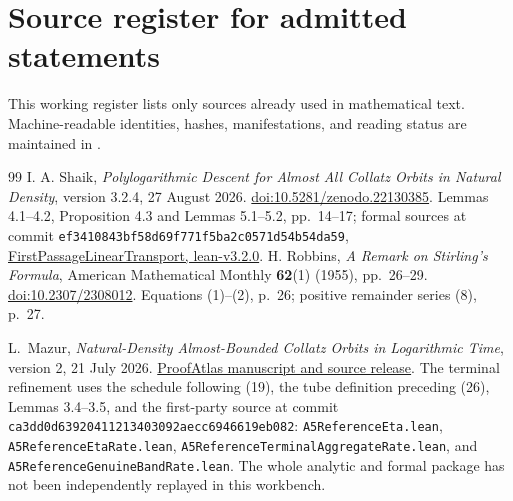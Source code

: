 \section{Source register for admitted statements}
\label{sec:source-register}

\begingroup
\sloppy
{}

This working register lists only sources already used in mathematical text.
Machine-readable identities, hashes, manifestations, and reading status are
maintained in .
\begin{thebibliography}{99}
 I. A. Shaik,
\emph{Polylogarithmic Descent for Almost All Collatz Orbits in Natural Density},
version 3.2.4, 27 August 2026.
\href{https://doi.org/10.5281/zenodo.22130385}{doi:10.5281/zenodo.22130385}.
Lemmas 4.1--4.2, Proposition 4.3 and Lemmas 5.1--5.2,
pp.~14--17; formal sources at commit
\texttt{ef3410843bf58d69f771f5ba2c0571d54b54da59},
\href{https://github.com/shaikidris/FirstPassageLinearTransport/tree/lean-v3.2.0}{FirstPassageLinearTransport, lean-v3.2.0}.
 H. Robbins, \emph{A Remark on Stirling's Formula},
American Mathematical Monthly \textbf{62}(1) (1955), pp.~26--29.
\href{https://doi.org/10.2307/2308012}{doi:10.2307/2308012}.
Equations (1)--(2), p.~26; positive remainder series (8), p.~27.

L.~Mazur, \emph{Natural-Density Almost-Bounded Collatz Orbits in
Logarithmic Time}, version 2, 21 July 2026.
\href{https://www.proofatlas.ai/formalizations/natural-density-log-time-collatz/}{ProofAtlas manuscript and source release}.
The terminal refinement uses the schedule following (19),
the tube definition preceding (26), Lemmas 3.4--3.5,
and the first-party source at commit
\texttt{ca3dd0d63920411213403092aecc6946619eb082}:
\texttt{A5ReferenceEta.lean}, \texttt{A5ReferenceEtaRate.lean},
\texttt{A5ReferenceTerminalAggregateRate.lean}, and
\texttt{A5ReferenceGenuineBandRate.lean}.
The whole analytic and formal package has not been independently
replayed in this workbench.


\end{thebibliography}
